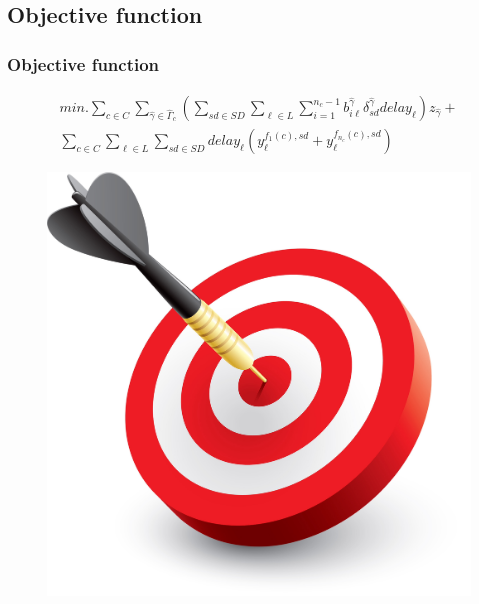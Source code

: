 \documentclass{beamer}
\begin{document}
\subsection{Objective function}
\begin{frame}
	\frametitle{Objective function}
	\begin{equation}
	\begin{split}
		min. \sum_{c\in C}\sum_{\hat{\gamma} \in \hat{\Gamma}_c} ( \sum_{sd \in SD} \sum_{\ell \in L} \sum_{i=1}^{n_c-1} b_{i \ell}^{\hat{\gamma}} \delta_{sd}^{\hat{\gamma}} delay_\ell)z_{\hat{\gamma}}+\\
		\sum_{c \in C} \sum_{\ell \in L} \sum_{sd \in SD} delay_\ell (y_\ell^{f_1(c),sd}+y_\ell^{f_{n_c}(c),sd})
		\end{split}
	\end{equation}
\begin{figure}
	\centering
	\includegraphics[width=0.3\linewidth]{objective}
	\label{fig:objective}
\end{figure}	
\end{frame}
\end{document}
